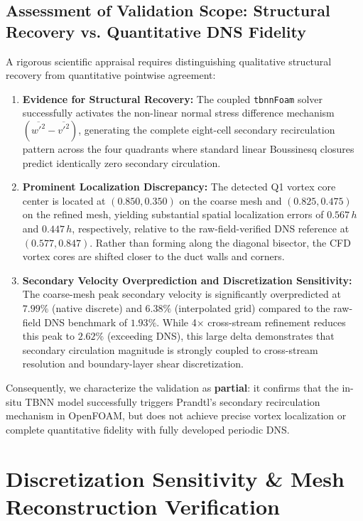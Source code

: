 \documentclass[11pt,a4paper]{article}
\begin{document}
\subsection{Assessment of Validation Scope: Structural Recovery vs. Quantitative DNS Fidelity}
A rigorous scientific appraisal requires distinguishing qualitative structural recovery from quantitative pointwise agreement:
\begin{enumerate}
    \item \textbf{Evidence for Structural Recovery:} The coupled \texttt{tbnnFoam} solver successfully activates the non-linear normal stress difference mechanism $(\overline{{w'}^2} - \overline{{v'}^2})$, generating the complete eight-cell secondary recirculation pattern across the four quadrants where standard linear Boussinesq closures predict identically zero secondary circulation.
    \item \textbf{Prominent Localization Discrepancy:} The detected Q1 vortex core center is located at $(0.850, 0.350)$ on the coarse mesh and $(0.825, 0.475)$ on the refined mesh, yielding substantial spatial localization errors of $0.567\,h$ and $0.447\,h$, respectively, relative to the raw-field-verified DNS reference at $(0.577, 0.847)$. Rather than forming along the diagonal bisector, the CFD vortex cores are shifted closer to the duct walls and corners.
    \item \textbf{Secondary Velocity Overprediction and Discretization Sensitivity:} The coarse-mesh peak secondary velocity is significantly overpredicted at $7.99\%$ (native discrete) and $6.38\%$ (interpolated grid) compared to the raw-field DNS benchmark of $1.93\%$. While 4$\times$ cross-stream refinement reduces this peak to $2.62\%$ (exceeding DNS), this large delta demonstrates that secondary circulation magnitude is strongly coupled to cross-stream resolution and boundary-layer shear discretization.
\end{enumerate}

Consequently, we characterize the validation as \textbf{partial}: it confirms that the in-situ TBNN model successfully triggers Prandtl's secondary recirculation mechanism in OpenFOAM, but does not achieve precise vortex localization or complete quantitative fidelity with fully developed periodic DNS.

\section{Discretization Sensitivity \& Mesh Reconstruction Verification}
\end{document}

